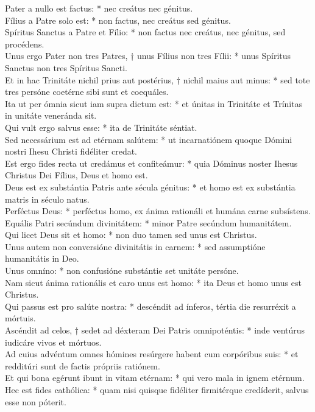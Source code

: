 {	Pater a nullo est factus: * nec creátus nec génitus. \\
	Fílius a Patre solo est: * non factus, nec creátus sed génitus. \\
	Spíritus Sanctus a Patre et Fílio: * non factus nec creátus, nec génitus, sed procédens. \\
	Unus ergo Pater non tres Patres, † unus Fílius non tres Fílii: * unus Spíritus Sanctus non tres Spíritus Sancti. \\
	Et in hac Trinitáte nichil prius aut postérius, † nichil maius aut minus: * sed tote tres persóne coetérne sibi sunt et coequáles. \\
	Ita ut per ómnia sicut iam supra dictum est: * et únitas in Trinitáte et Trínitas in unitáte veneránda sit. \\
	Qui vult ergo salvus esse: * ita de Trinitáte séntiat. \\
	Sed necessárium est ad etérnam salútem: * ut incarnatiónem quoque Dómini nostri Ihesu Christi fidéliter credat. \\
	Est ergo fides recta ut credámus et confiteámur: * quia Dóminus noster Ihesus Christus Dei Fílius, Deus et homo est. \\
	Deus est ex substántia Patris ante sécula génitus: * et homo est ex substántia matris in século natus. \\
	Perféctus Deus: * perféctus homo, ex ánima rationáli et humána carne subsístens. \\
	Equális Patri secúndum divinitátem: * minor Patre secúndum humanitátem. \\
	Qui licet Deus sit et homo: * non duo tamen sed unus est Christus. \\
	Unus autem non conversióne divinitátis in carnem: * sed assumptióne humanitátis in Deo. \\
	Unus omníno: * non confusióne substántie set unitáte persóne. \\
	Nam sicut ánima rationális et caro unus est homo: * ita Deus et homo unus est Christus. \\
	Qui passus est pro salúte nostra: * descéndit ad ínferos, tértia die resurréxit a mórtuis. \\
	Ascéndit ad celos, † sedet ad déxteram Dei Patris omnipoténtis: * inde ventúrus iudicáre vivos et mórtuos. \\
	Ad cuius advéntum omnes hómines resúrgere habent cum corpóribus suis: * et redditúri sunt de factis própriis ratiónem. \\
	Et qui bona egérunt ibunt in vitam etérnam: * qui vero mala in ignem etérnum. \\
	Hec est fides cathólica: * quam nisi quisque fidéliter firmitérque credíderit, salvus esse non póterit.
}

